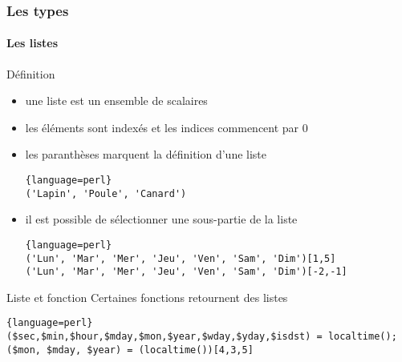 \begin{frame}[fragile]
  \frametitle{Les types}
  \framesubtitle{Les listes}

  \begin{block}{Définition}
    \begin{itemize}
      \item une liste est un ensemble de scalaires
      \item les éléments sont indexés et les indices commencent par 0
      \item les paranthèses marquent la définition d'une liste
        \begin{lstlisting}{language=perl}
('Lapin', 'Poule', 'Canard')
        \end{lstlisting}
      \item il est possible de sélectionner une sous-partie de la liste
        \begin{lstlisting}{language=perl}
('Lun', 'Mar', 'Mer', 'Jeu', 'Ven', 'Sam', 'Dim')[1,5]
('Lun', 'Mar', 'Mer', 'Jeu', 'Ven', 'Sam', 'Dim')[-2,-1]
        \end{lstlisting}
    \end{itemize}
  \end{block}

  \begin{alertblock}{Liste et fonction}
    Certaines fonctions retournent des listes
    \begin{lstlisting}{language=perl}
($sec,$min,$hour,$mday,$mon,$year,$wday,$yday,$isdst) = localtime();
($mon, $mday, $year) = (localtime())[4,3,5]
    \end{lstlisting}
  \end{alertblock}
\end{frame}

